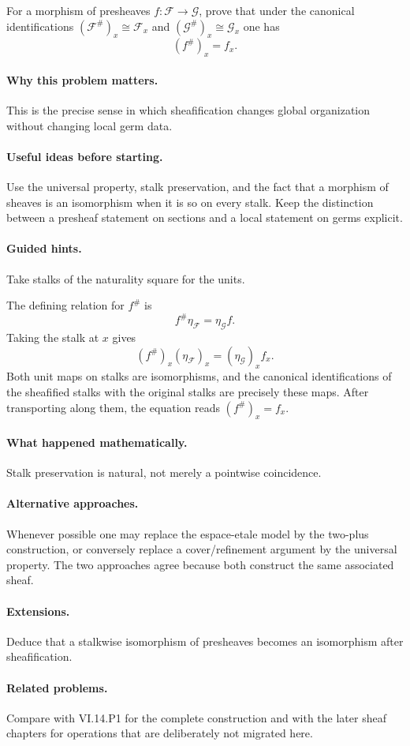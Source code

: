 \begin{problem}
For a morphism of presheaves $f:\mathcal F\to\mathcal G$, prove that under the canonical identifications
$(\mathcal F^\#)_x\cong\mathcal F_x$ and $(\mathcal G^\#)_x\cong\mathcal G_x$ one has
\[
(f^\#)_x=f_x.
\]
\end{problem}

\paragraph{Why this problem matters.}
This is the precise sense in which sheafification changes global organization without changing local germ data.

\paragraph{Useful ideas before starting.}
Use the universal property, stalk preservation, and the fact that a morphism of sheaves is an isomorphism when it is so on every stalk.  Keep the distinction between a presheaf statement on sections and a local statement on germs explicit.

\paragraph{Guided hints.}
Take stalks of the naturality square for the units.

\ifdefined\FullProblemDossiers
\begin{solution}
The defining relation for $f^\#$ is
\[
f^\#\eta_{\mathcal F}=\eta_{\mathcal G}f.
\]
Taking the stalk at $x$ gives
\[
(f^\#)_x(\eta_{\mathcal F})_x=(\eta_{\mathcal G})_x f_x.
\]
Both unit maps on stalks are isomorphisms, and the canonical identifications of the sheafified stalks with the original stalks are precisely these maps. After transporting along them, the equation reads $(f^\#)_x=f_x$.
\end{solution}

\paragraph{What happened mathematically.}
Stalk preservation is natural, not merely a pointwise coincidence.

\paragraph{Alternative approaches.}
Whenever possible one may replace the espace-etale model by the two-plus construction, or conversely replace a cover/refinement argument by the universal property.  The two approaches agree because both construct the same associated sheaf.

\paragraph{Extensions.}
Deduce that a stalkwise isomorphism of presheaves becomes an isomorphism after sheafification.

\paragraph{Related problems.}
Compare with VI.14.P1 for the complete construction and with the later sheaf chapters for operations that are deliberately not migrated here.
\fi
